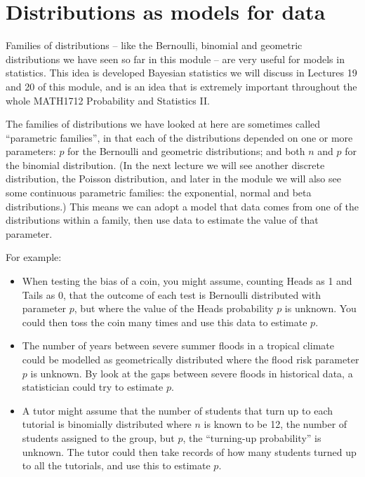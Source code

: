 \documentclass[
  letterpaper,
  DIV=11,
  numbers=noendperiod]{scrreprt}
\providecommand{\tightlist}{%
  \setlength{\itemsep}{0pt}\setlength{\parskip}{0pt}}\usepackage{longtable,booktabs,array}
\theoremstyle{remark}
\begin{document}
\hypertarget{models}{%
\section{Distributions as models for data}\label{models}}

Families of distributions -- like the Bernoulli, binomial and geometric
distributions we have seen so far in this module -- are very useful for
models in statistics. This idea is developed Bayesian statistics we will
discuss in Lectures 19 and 20 of this module, and is an idea that is
extremely important throughout the whole MATH1712 Probability and
Statistics II.

The families of distributions we have looked at here are sometimes
called ``parametric families'', in that each of the distributions
depended on one or more parameters: \(p\) for the Bernoulli and
geometric distributions; and both \(n\) and \(p\) for the binomial
distribution. (In the next lecture we will see another discrete
distribution, the Poisson distribution, and later in the module we will
also see some continuous parametric families: the exponential, normal
and beta distributions.) This means we can adopt a model that data comes
from one of the distributions within a family, then use data to estimate
the value of that parameter.

For example:

\begin{itemize}
\tightlist
\item
  When testing the bias of a coin, you might assume, counting Heads as 1
  and Tails as 0, that the outcome of each test is Bernoulli distributed
  with parameter \(p\), but where the value of the Heads probability
  \(p\) is unknown. You could then toss the coin many times and use this
  data to estimate \(p\).
\item
  The number of years between severe summer floods in a tropical climate
  could be modelled as geometrically distributed where the flood risk
  parameter \(p\) is unknown. By look at the gaps between severe floods
  in historical data, a statistician could try to estimate \(p\).
\item
  A tutor might assume that the number of students that turn up to each
  tutorial is binomially distributed where \(n\) is known to be 12, the
  number of students assigned to the group, but \(p\), the ``turning-up
  probability'' is unknown. The tutor could then take records of how
  many students turned up to all the tutorials, and use this to estimate
  \(p\).
\end{itemize}
\end{document}
